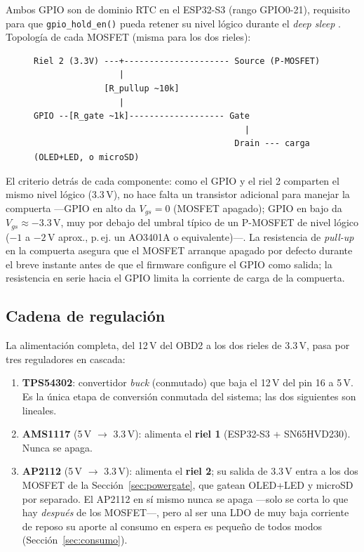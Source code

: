 Ambos GPIO son de dominio RTC en el ESP32-S3 (rango GPIO0-21), requisito
para que \texttt{gpio\_hold\_en()} pueda retener su nivel lógico durante el
\textit{deep sleep} \cite{espressif2024trm}. Topología de cada MOSFET
(misma para los dos rieles):

\begin{figure}[H]
\begin{lstlisting}[style=plain,caption={Interruptor de alto lado con P-MOSFET, un canal por riel.}]
Riel 2 (3.3V) ---+--------------------- Source (P-MOSFET)
                 |
              [R_pullup ~10k]
                 |
GPIO --[R_gate ~1k]------------------- Gate
                                          |
                                        Drain --- carga (OLED+LED, o microSD)
\end{lstlisting}
\end{figure}

El criterio detrás de cada componente: como el GPIO y el riel 2 comparten
el mismo nivel lógico (3.3\,V), no hace falta un transistor adicional para
manejar la compuerta —GPIO en alto da $V_{gs}=0$ (MOSFET apagado); GPIO en
bajo da $V_{gs}\approx-3.3\,\text{V}$, muy por debajo del umbral típico de
un P-MOSFET de nivel lógico ($-1$ a $-2\,\text{V}$ aprox., p.\,ej. un
AO3401A o equivalente)—. La resistencia de \textit{pull-up} en la
compuerta asegura que el MOSFET arranque apagado por defecto durante el
breve instante antes de que el firmware configure el GPIO como salida; la
resistencia en serie hacia el GPIO limita la corriente de carga de la
compuerta.

\subsection{Cadena de regulación}
\label{sec:regchain}
La alimentación completa, del 12\,V del OBD2 a los dos rieles de 3.3\,V,
pasa por tres reguladores en cascada:

\begin{enumerate}
  \item \textbf{TPS54302}: convertidor \textit{buck} (conmutado) que baja
        el 12\,V del pin 16 a 5\,V. Es la única etapa de conversión
        conmutada del sistema; las dos siguientes son lineales.
  \item \textbf{AMS1117} (5\,V $\rightarrow$ 3.3\,V): alimenta el
        \textbf{riel 1} (ESP32-S3 + SN65HVD230). Nunca se apaga.
  \item \textbf{AP2112} (5\,V $\rightarrow$ 3.3\,V): alimenta el
        \textbf{riel 2}; su salida de 3.3\,V entra a los dos MOSFET de la
        Sección~\ref{sec:powergate}, que gatean OLED+LED y microSD por
        separado. El AP2112 en sí mismo nunca se apaga —solo se corta lo
        que hay \textit{después} de los MOSFET—, pero al ser una LDO de
        muy baja corriente de reposo su aporte al consumo en espera es
        pequeño de todos modos (Sección~\ref{sec:consumo}).
\end{enumerate}

